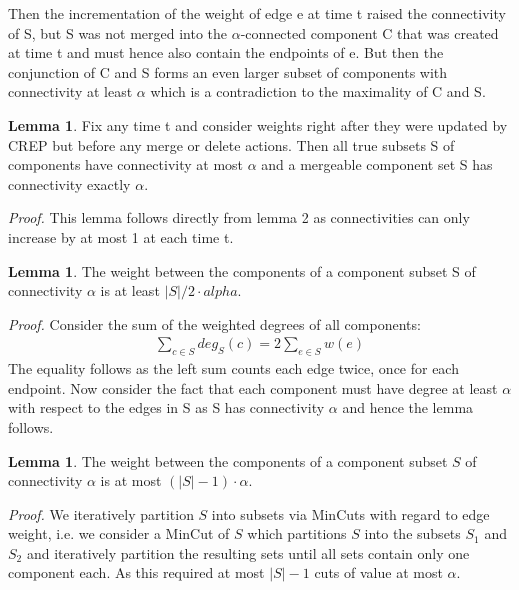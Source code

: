 \documentclass[xcolor=dvipsnames, tikz, 12pt]{article}
\newcommand{\crep}{C{\scriptsize REP}}
\theoremstyle{definition}
\newtheorem{lemma}[defi]{Lemma}
\begin{document}
Then the incrementation of the weight of edge e at time t raised the connectivity of S, but S was not merged into the $\alpha$-connected component C that was created at time t and must hence also contain the endpoints of e. But then the conjunction of C and S forms an even larger subset of components with connectivity at least $\alpha$ which is a contradiction to the maximality of C and S. 

\begin{lemma}
	\label{mergeable_lemma}
	Fix any time t and consider weights right after they were updated by \crep{} but before any merge or delete actions. Then all true subsets S of components have connectivity at most $\alpha$ and a mergeable component set S has connectivity exactly $\alpha$.
\end{lemma}

\textit{Proof.} This lemma follows directly from lemma 2 as connectivities can only increase by at most 1 at each time t.

\begin{lemma}
	\label{cut_lemma}
	The weight between the components of a component subset S of connectivity $\alpha$ is at least $|S|/2 \cdot alpha$.
\end{lemma}
\textit{Proof.} Consider the sum of the weighted degrees of all components:
\begin{align*}
\sum_{c\in S}deg_S(c)=2\sum_{e\in S}w(e)
\end{align*}
The equality follows as the left sum counts each edge twice, once for each endpoint.
Now consider the fact that each component must have degree at least $\alpha$ with respect to the edges in S as S has connectivity $\alpha$ and hence the lemma follows.

\begin{lemma}
	\label{cut_lemma_upper}
	The weight between the components of a component subset $S$ of connectivity $\alpha$ is at most $(|S|-1)\cdot\alpha$.
\end{lemma}
\textit{Proof.} We iteratively partition $S$ into subsets via MinCuts with regard to edge weight, i.e. we consider a MinCut of $S$ which partitions $S$ into the subsets $S_1$ and $S_2$ and iteratively partition the resulting sets until all sets contain only one component each. As this required at most $|S|-1$ cuts of value at most $\alpha$.
\end{document}
